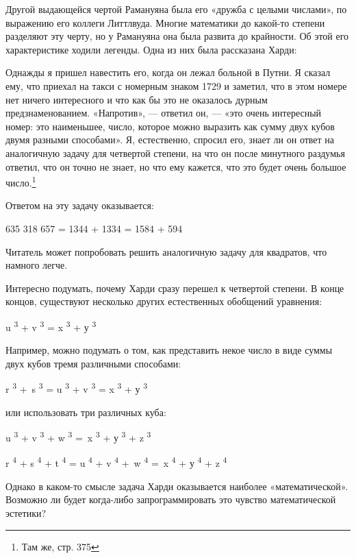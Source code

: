 \documentclass[../main.tex]{subfiles}
\begin{document}
Другой выдающейся чертой Рамануяна была его «дружба с целыми числами», по выражению его коллеги Литтлвуда. Многие математики до какой-то степени разделяют эту черту, но у Рамануяна она была развита до крайности. Об этой его характеристике ходили легенды. Одна из них была рассказана Харди:

Однажды я пришел навестить его, когда он лежал больной в Путни. Я сказал ему, что приехал на такси с номерным знаком 1729 и заметил, что в этом номере нет ничего интересного и что как бы это не оказалось дурным предзнаменованием. «Напротив», --- ответил он, --- «это очень интересный номер: это наименьшее, число, которое можно выразить как сумму двух кубов двумя разными способами». Я, естественно, спросил его, знает ли он ответ на аналогичную задачу для четвертой степени, на что он после минутного раздумья ответил, что он точно не знает, но что ему кажется, что это будет очень большое число.\footnote{Там же, стр. 375}

Ответом на эту задачу оказывается:

635 318 657 = 1344 + 1334 = 1584 + 594

Читатель может попробовать решить аналогичную задачу для квадратов, что намного легче.

Интересно подумать, почему Харди сразу перешел к четвертой степени. В конце концов, существуют несколько других естественных обобщений уравнения:

u \textsuperscript{3} + v \textsuperscript{3} = x \textsuperscript{3} + у \textsuperscript{3}

Например, можно подумать о том, как представить некое число в виде суммы двух кубов тремя различными способами:

r \textsuperscript{3} +~s \textsuperscript{3} = u \textsuperscript{3} + v \textsuperscript{3} = x \textsuperscript{3} + у \textsuperscript{3}

или использовать три различных куба:

u \textsuperscript{3} + v \textsuperscript{3} + w \textsuperscript{3} =~x \textsuperscript{3} + у \textsuperscript{3} + z \textsuperscript{3}

r \textsuperscript{4} + s \textsuperscript{4} + t \textsuperscript{4} = u \textsuperscript{4} + v \textsuperscript{4} +~w \textsuperscript{4} =~x \textsuperscript{4} + у \textsuperscript{4} + z \textsuperscript{4}

Однако в каком-то смысле задача Харди оказывается наиболее «математической». Возможно ли будет когда-либо запрограммировать это чувство математической эстетики?
\end{document}
